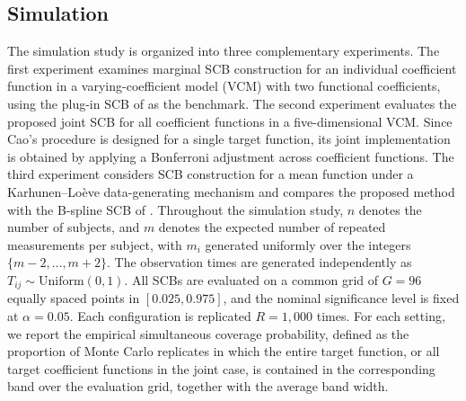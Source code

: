 \documentclass[12pt]{article} %
\theoremstyle{definition}
\begin{document}
\subsection{Simulation}
\label{subsec:simulation}

The simulation study is organized into three complementary experiments. The
first experiment examines marginal SCB construction for an individual
coefficient function in a varying-coefficient model (VCM) with two functional
coefficients, using the plug-in SCB of \citet{Cao2018} as the
benchmark. The second experiment evaluates the proposed joint SCB for all
coefficient functions in a five-dimensional VCM. Since Cao's procedure is
designed for a single target function, its joint implementation is obtained by
applying a Bonferroni adjustment across coefficient functions. The third
experiment considers SCB construction for a mean function under a
Karhunen--Lo\`eve data-generating mechanism and compares the proposed method
with the B-spline SCB of \citet{CaiHu2025}. Throughout the
simulation study, \(n\) denotes the number of subjects, and \(m\) denotes the
expected number of repeated measurements per subject, with \(m_i\) generated
uniformly over the integers \(\{m-2,\ldots,m+2\}\). The observation times are
generated independently as \(T_{ij}\sim \mathrm{Uniform}(0,1)\). All SCBs are
evaluated on a common grid of \(G=96\) equally spaced points in
\([0.025,0.975]\), and the nominal significance level is fixed at
\(\alpha=0.05\). Each configuration is replicated \(R=1{,}000\) times. For each
setting, we report the empirical simultaneous coverage probability, defined as
the proportion of Monte Carlo replicates in which the entire target function,
or all target coefficient functions in the joint case, is contained in the
corresponding band over the evaluation grid, together with the average band
width.
\end{document}

